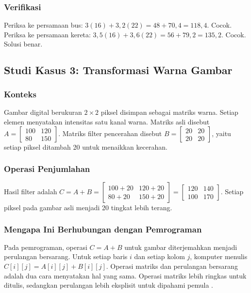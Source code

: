\documentclass[11pt,a4paper]{article}
\begin{document}
\subsubsection{Verifikasi}

Periksa ke persamaan bus: $3(16)+3{,}2(22)=48+70{,}4=118{,}4$. Cocok. Periksa ke persamaan kereta: $3{,}5(16)+3{,}6(22)=56+79{,}2=135{,}2$. Cocok. Solusi benar.

\subsection{Studi Kasus 3: Transformasi Warna Gambar}

\subsubsection{Konteks}

Gambar digital berukuran $2 \times 2$ piksel disimpan sebagai matriks warna. Setiap elemen menyatakan intensitas satu kanal warna. Matriks asli disebut $A=\begin{bmatrix}100&120\\80&150\end{bmatrix}$. Matriks filter pencerahan disebut $B=\begin{bmatrix}20&20\\20&20\end{bmatrix}$, yaitu setiap piksel ditambah 20 untuk menaikkan kecerahan.

\subsubsection{Operasi Penjumlahan}

Hasil filter adalah $C=A+B=\begin{bmatrix}100+20&120+20\\80+20&150+20\end{bmatrix}=\begin{bmatrix}120&140\\100&170\end{bmatrix}$. Setiap piksel pada gambar asli menjadi 20 tingkat lebih terang.

\subsubsection{Mengapa Ini Berhubungan dengan Pemrograman}

Pada pemrograman, operasi $C=A+B$ untuk gambar diterjemahkan menjadi perulangan bersarang. Untuk setiap baris $i$ dan setiap kolom $j$, komputer menulis $C[i][j]=A[i][j]+B[i][j]$. Operasi matriks dan perulangan bersarang adalah dua cara menyatakan hal yang sama. Operasi matriks lebih ringkas untuk ditulis, sedangkan perulangan lebih eksplisit untuk dipahami pemula \cite{gonzalez}.
\end{document}
